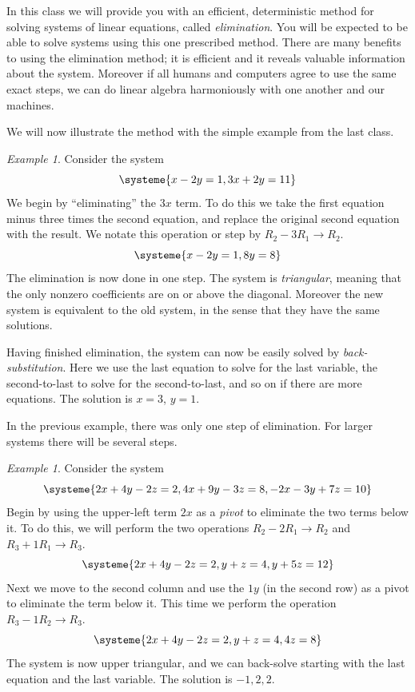 \documentclass[11pt,oneside]{amsbook}
\theoremstyle{definition}
\theoremstyle{plain}
\theoremstyle{definition}
\theoremstyle{remark}
\newtheorem{example}[theorem]{Example}
\numberwithin{equation}{section}
\numberwithin{figure}{section}
\begin{document}
In this class we will provide you with an efficient, deterministic method for solving systems of linear equations, called \emph{elimination}. You will be expected to be able to solve systems using this one prescribed method. There are many benefits to using the elimination method; it is efficient and it reveals valuable information about the system. Moreover if all humans and computers agree to use the same exact steps, we can do linear algebra harmoniously with one another and our machines.

We will now illustrate the method with the simple example from the last class.

\begin{example}
  Consider the system
  \[\systeme{x-2y=1,3x+2y=11}
  \]
  We begin by ``eliminating'' the $3x$ term. To do this we take the first equation minus three times the second equation, and replace the original second equation with the result. We notate this operation or step by $R_2-3R_1\to R_2$.
  \[\systeme{x-2y=1,8y=8}
  \]
  The elimination is now done in one step. The system is \emph{triangular}, meaning that the only nonzero coefficients are on or above the diagonal. Moreover the new system is equivalent to the old system, in the sense that they have the same solutions.

  Having finished elimination, the system can now be easily solved by \emph{back-substitution}. Here we use the last equation to solve for the last variable, the second-to-last to solve for the second-to-last, and so on if there are more equations. The solution is $x=3$, $y=1$.
\end{example}

In the previous example, there was only one step of elimination. For larger systems there will be several steps.

\begin{example}
  Consider the system
  \[\systeme{2x+4y-2z=2,4x+9y-3z=8,-2x-3y+7z=10}
  \]
  Begin by using the upper-left term $2x$ as a \emph{pivot} to eliminate the two terms below it. To do this, we will perform the two operations $R_2-2R_1\to R_2$ and $R_3+1R_1\to R_3$.
  \[\systeme{2x+4y-2z=2,y+z=4,y+5z=12}
  \]
  Next we move to the second column and use the $1y$ (in the second row) as a pivot to eliminate the term below it. This time we perform the operation $R_3-1R_2\to R_3$.
  \[\systeme{2x+4y-2z=2,y+z=4,4z=8}
  \]
  The system is now upper triangular, and we can back-solve starting with the last equation and the last variable. The solution is $-1,2,2$.
\end{example}
\end{document}
